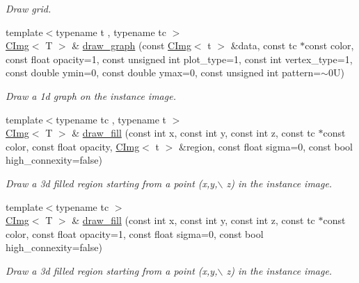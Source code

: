 \begin{DoxyCompactItemize}
\begin{DoxyCompactList}\small\item\em Draw grid. \item\end{DoxyCompactList}\item 
{\footnotesize template$<$typename t , typename tc $>$ }\\\hyperlink{structcimg__library_1_1CImg}{CImg}$<$ T $>$ \& \hyperlink{structcimg__library_1_1CImg_a3995b6769b44b1db64c4b89fc1aadba3}{draw\_\-graph} (const \hyperlink{structcimg__library_1_1CImg}{CImg}$<$ t $>$ \&data, const tc $\ast$const color, const float opacity=1, const unsigned int plot\_\-type=1, const int vertex\_\-type=1, const double ymin=0, const double ymax=0, const unsigned int pattern=$\sim$0U)
\begin{DoxyCompactList}\small\item\em Draw a 1d graph on the instance image. \item\end{DoxyCompactList}\item 
{\footnotesize template$<$typename tc , typename t $>$ }\\\hyperlink{structcimg__library_1_1CImg}{CImg}$<$ T $>$ \& \hyperlink{structcimg__library_1_1CImg_a02af5e263936e2fc27aeaa3771cb31d4}{draw\_\-fill} (const int x, const int y, const int z, const tc $\ast$const color, const float opacity, \hyperlink{structcimg__library_1_1CImg}{CImg}$<$ t $>$ \&region, const float sigma=0, const bool high\_\-connexity=false)
\begin{DoxyCompactList}\small\item\em Draw a 3d filled region starting from a point ({\ttfamily x},{\ttfamily y},$\backslash$ z) in the instance image. \item\end{DoxyCompactList}\item 
{\footnotesize template$<$typename tc $>$ }\\\hyperlink{structcimg__library_1_1CImg}{CImg}$<$ T $>$ \& \hyperlink{structcimg__library_1_1CImg_af162693c97503ffb9789fcb2f8e16104}{draw\_\-fill} (const int x, const int y, const int z, const tc $\ast$const color, const float opacity=1, const float sigma=0, const bool high\_\-connexity=false)
\begin{DoxyCompactList}\small\item\em Draw a 3d filled region starting from a point ({\ttfamily x},{\ttfamily y},$\backslash$ z) in the instance image. \item\end{DoxyCompactList}\item 

\end{DoxyCompactItemize}
